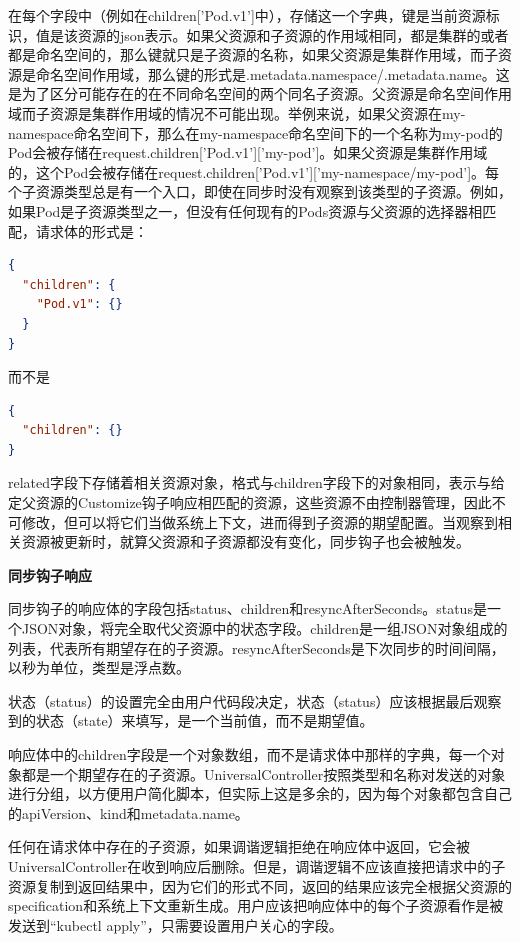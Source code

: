 \documentclass[macfonts,master]{njuthesis}
\begin{document}
在每个字段中（例如在children['Pod.v1']中），存储这一个字典，键是当前资源标识，值是该资源的json表示。如果父资源和子资源的作用域相同，都是集群的或者都是命名空间的，那么键就只是子资源的名称，如果父资源是集群作用域，而子资源是命名空间作用域，那么键的形式是{.metadata.namespace}/{.metadata.name}。这是为了区分可能存在的在不同命名空间的两个同名子资源。父资源是命名空间作用域而子资源是集群作用域的情况不可能出现。举例来说，如果父资源在my-namespace命名空间下，那么在my-namespace命名空间下的一个名称为my-pod的Pod会被存储在request.children['Pod.v1']['my-pod']。如果父资源是集群作用域的，这个Pod会被存储在request.children['Pod.v1']['my-namespace/my-pod']。每个子资源类型总是有一个入口，即使在同步时没有观察到该类型的子资源。例如，如果Pod是子资源类型之一，但没有任何现有的Pods资源与父资源的选择器相匹配，请求体的形式是：
\begin{lstlisting}[language=json,caption=请求体,label=listing:7]
{
  "children": {
    "Pod.v1": {}
  }
}
\end{lstlisting}
而不是
\begin{lstlisting}[language=json,caption=异常请求体,label=listing:8]
{
  "children": {}
}
\end{lstlisting}

related字段下存储着相关资源对象，格式与children字段下的对象相同，表示与给定父资源的Customize钩子响应相匹配的资源，这些资源不由控制器管理，因此不可修改，但可以将它们当做系统上下文，进而得到子资源的期望配置。当观察到相关资源被更新时，就算父资源和子资源都没有变化，同步钩子也会被触发。

\textbf{同步钩子响应}

同步钩子的响应体的字段包括status、children和resyncAfterSeconds。status是一个JSON对象，将完全取代父资源中的状态字段。children是一组JSON对象组成的列表，代表所有期望存在的子资源。resyncAfterSeconds是下次同步的时间间隔，以秒为单位，类型是浮点数。

状态（status）的设置完全由用户代码段决定，状态（status）应该根据最后观察到的状态（state）来填写，是一个当前值，而不是期望值。

响应体中的children字段是一个对象数组，而不是请求体中那样的字典，每一个对象都是一个期望存在的子资源。UniversalController按照类型和名称对发送的对象进行分组，以方便用户简化脚本，但实际上这是多余的，因为每个对象都包含自己的apiVersion、kind和metadata.name。

任何在请求体中存在的子资源，如果调谐逻辑拒绝在响应体中返回，它会被UniversalController在收到响应后删除。但是，调谐逻辑不应该直接把请求中的子资源复制到返回结果中，因为它们的形式不同，返回的结果应该完全根据父资源的specification和系统上下文重新生成。用户应该把响应体中的每个子资源看作是被发送到``kubectl apply''，只需要设置用户关心的字段。
\end{document}
